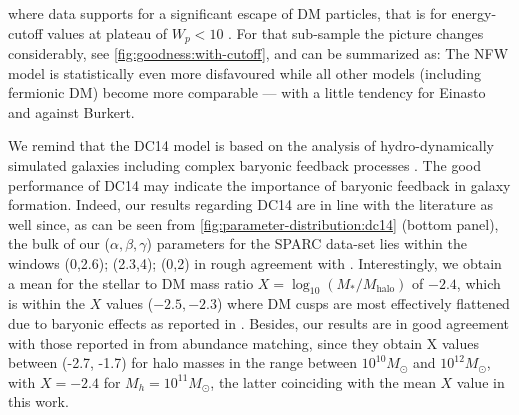 where data supports for a significant escape of DM particles, that is for energy-cutoff values at plateau of $W_p < 10$ . For that sub-sample the picture changes considerably, see \cref{fig:goodness:with-cutoff}, and can be summarized as: The NFW model is statistically even more disfavoured while all other models (including fermionic DM) become more comparable --- with a little tendency for Einasto and against Burkert.

We remind that the DC14 model is based on the analysis of hydro-dynamically simulated galaxies including complex baryonic feedback processes \citep{2014MNRAS.441.2986D}. The good performance of DC14 may indicate the importance of baryonic feedback in galaxy formation. Indeed, our results regarding DC14 are in line with the literature as well since, as can be seen from \cref{fig:parameter-distribution:dc14} (bottom panel), the bulk of our ($\alpha,\beta,\gamma$) parameters for the SPARC data-set lies within the windows (0,2.6); (2.3,4); (0,2) in rough agreement with \citet{2014MNRAS.441.2986D}. Interestingly, we obtain a mean for the stellar to DM mass ratio $X = \log_{10}(M_*/M_\mathrm{halo})$ of $-2.4$, which is within the $X$ values ($-2.5,-2.3$) where DM cusps are most effectively flattened due to baryonic effects as reported in \citet{2014MNRAS.441.2986D}. Besides, our results are in good agreement with those reported in \citet{2013ApJ...770...57B} from abundance matching, since they obtain X values between (-2.7, -1.7) for halo masses in the range between $10^{10} M_\odot$ and $10^{12} M_\odot$, with $X=-2.4$ for $M_h=10^{11} M_\odot$, the latter coinciding with the mean $X$ value in this work.


